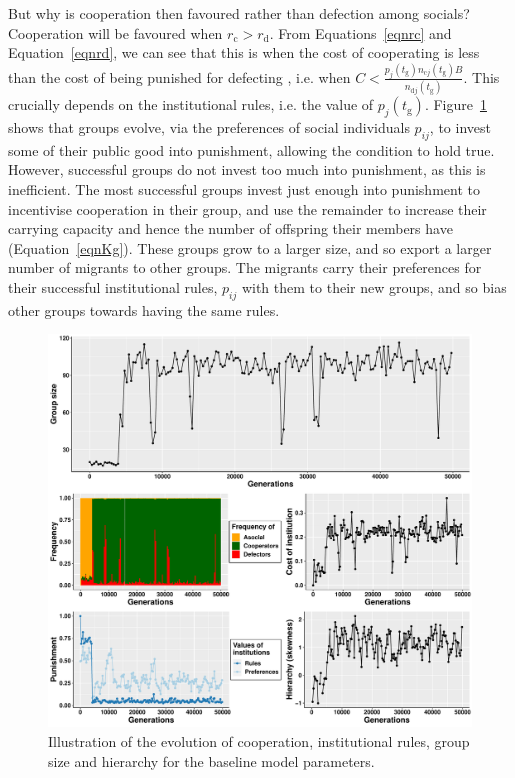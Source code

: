 \documentclass{rstb}
\begin{document}
\begin{linenumbers}
But why is cooperation then favoured rather than defection among socials? Cooperation will be favoured when $r_\mathrm{c}>r_\mathrm{d}$. From Equations~\ref{eqnrc} and Equation~\ref{eqnrd}, we can see that this is when the cost of cooperating is less than the cost of being punished for defecting \cite{Boyd:1992:a}, i.e. when $C < \frac{p_j(t_\mathrm{g})n_{\mathrm{c}j}(t_\mathrm{g})B}{n_{\mathrm{d}j}\left(t_\mathrm{g}\right)}$. This crucially depends on the institutional rules, i.e. the value of $p_j(t_\mathrm{g})$. Figure~\ref{figBaseline} shows that groups evolve, via the preferences of social individuals $p_{ij}$, to invest some of their public good into punishment, allowing the condition to hold true. However, successful groups do not invest too much into punishment, as this is inefficient. The most successful groups invest just enough into punishment to incentivise cooperation in their group, and use the remainder to increase their carrying capacity and hence the number of offspring their members have (Equation~\ref{eqnKg}). These groups grow to a larger size, and so export a larger number of migrants to other groups. The migrants carry their preferences for their successful institutional rules, $p_{ij}$ with them to their new groups, and so bias other groups towards having the same rules.  

\begin{figure}
    \centering
    \includegraphics[width=0.8\linewidth]{Figures/pt_summary.pdf}
    \caption{Illustration of the evolution of cooperation, institutional rules, group size and hierarchy for the baseline model parameters.}
    \label{figBaseline}
\end{figure}


\end{linenumbers}
\end{document}
